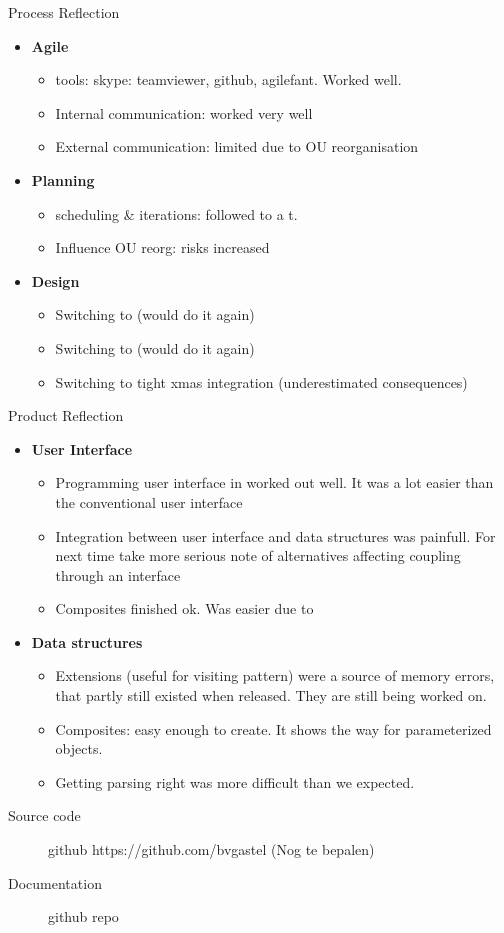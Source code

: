 \documentclass[11pt]{beamer}
\begin{document}
\begin{frame}{Process Reflection}
	\begin{itemize}
		\item {\bf Agile} 
				\begin{itemize}
					\item tools: skype: teamviewer, github, agilefant. Worked well.
					\item Internal communication: worked very well
					\item External communication: limited due to OU reorganisation
				\end{itemize}
		\item {\bf Planning}
				\begin{itemize}
					\item scheduling \& iterations: followed to a t.
					\item Influence OU reorg: risks increased
				\end{itemize}
		\item {\bf Design} 
			\begin{itemize}
				\item Switching to \qt				 (would do it again)
				\item Switching to \qml				 (would do it again)
				\item Switching to tight xmas integration (underestimated consequences)
			\end{itemize}
	\end{itemize}
\end{frame}

\begin{frame}{Product Reflection}
	\begin{itemize}
		\item {\bf User Interface} 
				\begin{itemize}
					\item Programming user interface in \qml worked out well.
							It was a lot easier than the conventional user interface
					\item Integration between user interface and data structures
							was painfull. For next time take more serious note
							of alternatives affecting coupling through an interface
					\item Composites finished ok. Was easier due to \qml
				\end{itemize}
		\item {\bf Data structures}
				\begin{itemize}
					\item Extensions (useful for visiting pattern) were a source
							of memory errors, that partly still existed when
							released. They are still being worked on.
					\item Composites: easy enough to create. It shows the way
							for parameterized objects.
					\item Getting parsing right was more difficult than we expected.
				\end{itemize}
	\end{itemize}
\end{frame}

\begin{frame}
	\begin{description}
		\item[Source code] github https://github.com/bvgastel (Nog te bepalen)
		\item[Documentation] github repo
	\end{description}
\end{frame}
\end{document}
